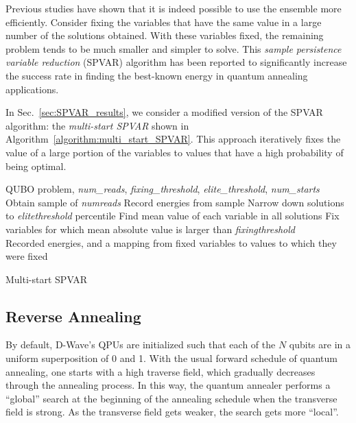 \documentclass[aps,prd,twocolumn,superscriptaddress,preprintnumbers,nofootinbib,longbibliography,floatfix]{revtex4-1}
\DeclareRobustCommand{\Sec}[1]{Sec.~\ref{sec:#1}}
\begin{document}
Previous studies have shown that it is indeed possible to use the ensemble more efficiently.
%
Consider fixing the variables that have the same value in a large number of the solutions obtained.
%
With these variables fixed, the remaining problem tends to be much smaller and simpler to solve.
%
This \textit{sample persistence variable reduction} (SPVAR) algorithm \cite{Karimi2017} has been reported to significantly increase the success rate in finding the best-known energy in quantum annealing applications.


In \Sec{SPVAR_results}, we consider a modified version of the SPVAR algorithm: the \textit{multi-start SPVAR} \cite{Karimi2017_2} shown in Algorithm~\ref{algorithm:multi_start_SPVAR}.
%
This approach iteratively fixes the value of a large portion of the variables to values that have a high probability of being optimal.


\begin{algorithm}[H]  
\footnotesize
\begin{algorithmic}
\Require QUBO problem, \textit{num\_reads}, 
\State \textit{fixing\_threshold}, \textit{elite\_threshold}, \textit{num\_starts} \\
        \State Obtain sample of \textit{num\textunderscore reads}
        \State Record energies from sample
        \State Narrow down solutions to \textit{elite\textunderscore threshold} percentile
        \State Find mean value of each variable in all solutions
        \State Fix variables for which mean absolute value is larger than \textit{fixing\textunderscore threshold}
\EndFor \\
\Return Recorded energies, and a mapping from fixed variables to values to which they were fixed
\end{algorithmic}
\caption{Multi-start SPVAR~\cite{Karimi2017_2}} 
\label{algorithm:multi_start_SPVAR}
\end{algorithm}


\subsection{Reverse Annealing}

By default, D-Wave's QPUs are initialized such that each of the $N$ qubits are in a uniform superposition of 0 and 1. 
%
With the usual forward schedule of quantum annealing, one starts with a high traverse field, which gradually decreases through the annealing process.
%
In this way, the quantum annealer performs a ``global'' search at the beginning of the annealing schedule when the transverse field is strong.
%
As the transverse field gets weaker, the search gets more ``local''.
\end{document}
